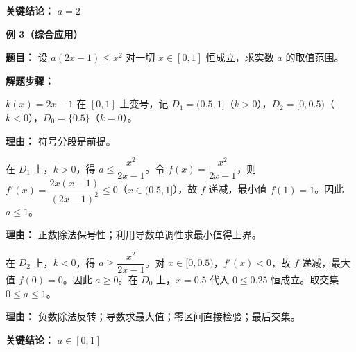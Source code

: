 \begin{examplebox}
	\textbf{\textcolor{CExample}{关键结论：}}
	\textbf{$a=2$}

	\medskip
	\textbf{\textcolor{CExample}{例 3（综合应用）}}

	\textbf{\textcolor{CExample}{题目：}}
	设 $a(2x-1) \le x^2$ 对一切 $x\in[0,1]$ 恒成立，求实数 $a$ 的取值范围。

	\textbf{\textcolor{CExample}{解题步骤：}}
	\begin{description}[style=nextline, leftmargin=2.8em, labelsep=0.5em, itemsep=0.45em]
		\item[\textbf{第一步（划分区间）：}] $k(x)=2x-1$ 在 $[0,1]$ 上变号，记 $D_1=(0.5,1]$（$k>0$），$D_2=[0,0.5)$（$k<0$），$D_0=\{0.5\}$（$k=0$）。
			\par\textbf{理由：} 符号分段是前提。
		\item[\textbf{第二步（正区间求上界）：}] 在 $D_1$ 上，$k>0$，得 $a\le \dfrac{x^2}{2x-1}$。令 $f(x)=\dfrac{x^2}{2x-1}$，则 $f'(x)=\dfrac{2x(x-1)}{(2x-1)^2}\le0$（$x\in(0.5,1]$），故 $f$ 递减，最小值 $f(1)=1$。因此 $a\le 1$。
			\par\textbf{理由：} 正数除法保号性；利用导数单调性求最小值得上界。
		\item[\textbf{第三步（负区间求下界取交集）：}] 在 $D_2$ 上，$k<0$，得 $a\ge \dfrac{x^2}{2x-1}$。对 $x\in[0,0.5)$，$f'(x)<0$，故 $f$ 递减，最大值 $f(0)=0$。因此 $a\ge 0$。在 $D_0$ 上，$x=0.5$ 代入 $0\le0.25$ 恒成立。取交集 $0\le a\le 1$。
			\par\textbf{理由：} 负数除法反转；导数求最大值；零区间直接检验；最后交集。
	\end{description}

	\textbf{\textcolor{CExample}{关键结论：}}
	\textbf{$a\in[0,1]$}
\end{examplebox}
